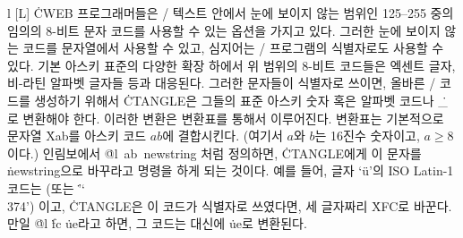 \@{l} [L] \.{CWEB} 프로그래머들은 \TEX/ 텍스트 안에서 눈에 보이지 않는
범위인 125--255 중의 임의의 8-비트 문자 코드를 사용할 수 있는 옵션을
가지고 있다. 그러한 눈에 보이지 않는 코드를 문자열에서 사용할 수 있고,
심지어는 \CEE/ 프로그램의 식별자로도 사용할 수 있다. 기본 아스키 표준의
다양한 확장 하에서 위 범위의 8-비트 코드들은 엑센트 글자, 비-라틴 알파벳 글자들 등과 대응된다.
그러한 문자들이
식별자로 쓰이면, 올바른 \CEE/ 코드를 생성하기 위해서 \.{CTANGLE}은
그들의 표준 아스키 숫자 혹은 알파벳 코드나 \.{\_}로 변환해야 한다. 이러한
변환은 변환표를 통해서 이루어진다. 변환표는
기본적으로 문자열 \.{Xab}를 아스키 코드 \T{\^}$ab$에
결합시킨다. (여기서 $a$와 $b$는 16진수 숫자이고, $a\ge8$이다.) 
인림보에서 \.{@l\ ab\ newstring} 처럼 정의하면, \.{CTANGLE}에게 이
문자를 \.{newstring}으로 바꾸라고 명령을 하게 되는 것이다. 예를 들어, 
글자 `\"u'의 ISO Latin-1 코드는  (또는 \.{'\char`\\374'})
이고, \.{CTANGLE}은 이 코드가 식별자로 쓰였다면, 세 글자짜리 \.{XFC}로
바꾼다. 만일 \.{@l} \.{fc} \.{ue}라고 하면, 그 코드는 대신에 \.{ue}로
변환된다. 

